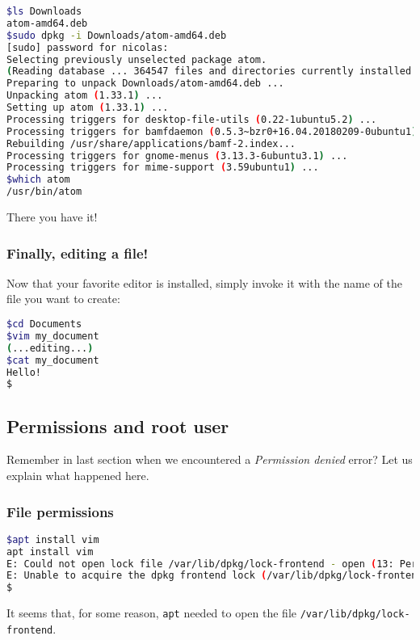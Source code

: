 \documentclass[12pt]{article}
\begin{document}
\begin{lstlisting}[language=bash]
$ls Downloads
atom-amd64.deb
$sudo dpkg -i Downloads/atom-amd64.deb
[sudo] password for nicolas: 
Selecting previously unselected package atom.
(Reading database ... 364547 files and directories currently installed.)
Preparing to unpack Downloads/atom-amd64.deb ...
Unpacking atom (1.33.1) ...
Setting up atom (1.33.1) ...
Processing triggers for desktop-file-utils (0.22-1ubuntu5.2) ...
Processing triggers for bamfdaemon (0.5.3~bzr0+16.04.20180209-0ubuntu1) ...
Rebuilding /usr/share/applications/bamf-2.index...
Processing triggers for gnome-menus (3.13.3-6ubuntu3.1) ...
Processing triggers for mime-support (3.59ubuntu1) ...
$which atom
/usr/bin/atom
\end{lstlisting}

There you have it!

\subsubsection{Finally, editing a file!}


Now that your favorite editor is installed, simply invoke it with the name of the file you want to create:

\begin{lstlisting}[language=bash]
$cd Documents
$vim my_document
(...editing...)
$cat my_document 
Hello!
$
\end{lstlisting}


\subsection{Permissions and root user}

Remember in last section when we encountered a \textit{Permission denied} error? Let us explain what happened here.

\subsubsection{File permissions}

\begin{lstlisting}[language=bash]
$apt install vim
apt install vim
E: Could not open lock file /var/lib/dpkg/lock-frontend - open (13: Permission denied)
E: Unable to acquire the dpkg frontend lock (/var/lib/dpkg/lock-frontend), are you root?
$
\end{lstlisting}

It seems that, for some reason, \texttt{apt} needed to open the file \texttt{/var/lib/dpkg/lock-frontend}.
\end{document}
